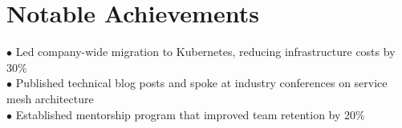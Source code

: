 \documentclass[letterpaper,11pt]{article}
\begin{document}
\section{Notable Achievements}
 \begin{itemize}[leftmargin=0.15in, label={}]
    \small{\item{
     $\bullet$ Led company-wide migration to Kubernetes, reducing infrastructure costs by 30\% \\
     $\bullet$ Published technical blog posts and spoke at industry conferences on service mesh architecture \\
     $\bullet$ Established mentorship program that improved team retention by 20\%
    }}
 \end{itemize}

\end{document}
